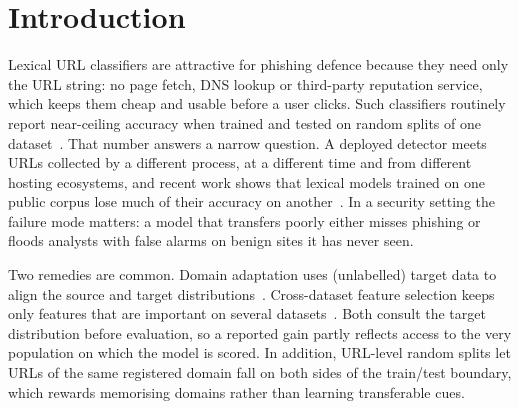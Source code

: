 \section{Introduction}
Lexical URL classifiers are attractive for phishing defence because they need only the URL string: no page fetch, DNS lookup or third-party reputation service, which keeps them cheap and usable before a user clicks. Such classifiers routinely report near-ceiling accuracy when trained and tested on random splits of one dataset~\cite{sahingoz2019}. That number answers a narrow question. A deployed detector meets URLs collected by a different process, at a different time and from different hosting ecosystems, and recent work shows that lexical models trained on one public corpus lose much of their accuracy on another~\cite{rashid2024,kanon2026,misiek2026}. In a security setting the failure mode matters: a model that transfers poorly either misses phishing or floods analysts with false alarms on benign sites it has never seen.

Two remedies are common. Domain adaptation uses (unlabelled) target data to align the source and target distributions~\cite{rashid2024}. Cross-dataset feature selection keeps only features that are important on several datasets~\cite{kanon2026,misiek2026}. Both consult the target distribution before evaluation, so a reported gain partly reflects access to the very population on which the model is scored. In addition, URL-level random splits let URLs of the same registered domain fall on both sides of the train/test boundary, which rewards memorising domains rather than learning transferable cues.

